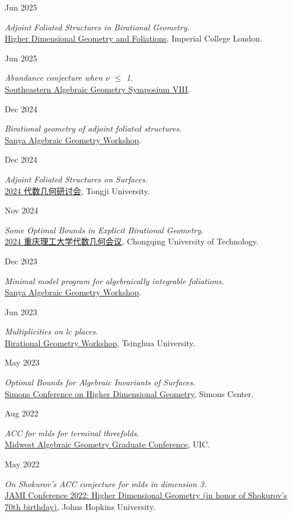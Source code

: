 \documentclass[11pt]{article}
\newlength{\datewidth}
\newcommand{\entry}[2]{%
  \noindent
  \begin{minipage}[t]{\datewidth}
    \raggedright\small\color{muted}#1
  \end{minipage}%
  \hfill%
  \begin{minipage}[t]{\dimexpr\linewidth-\datewidth-0.1in\relax}
    \raggedright #2
  \end{minipage}\par\vspace{4pt}
}
\begin{document}
\entry{Jun 2025}{\emph{Adjoint Foliated Structures in Birational Geometry.}\\ \href{https://simonsmoduli.com/events/london/}{Higher Dimensional Geometry and Foliations}, Imperial College London.}

\entry{Jun 2025}{\emph{Abundance conjecture when $\nu$ $\le$ 1.}\\ \href{https://math.sustech.edu.cn/conference/13283.html?lang=en}{Southeastern Algebraic Geometry Symposium VIII}.}

\entry{Dec 2024}{\emph{Birational geometry of adjoint foliated structures.}\\ \href{https://www.tsimf.cn/meeting/agenda?id=390}{Sanya Algebraic Geometry Workshop}.}

\entry{Dec 2024}{\emph{Adjoint Foliated Structures on Surfaces.}\\ \href{https://math.tongji.edu.cn/info/1019/11822.htm}{2024 {\cnfont 代数几何研讨会}}, Tongji University.}

\entry{Nov 2024}{\emph{Some Optimal Bounds in Explicit Birational Geometry.}\\ \href{https://msrc.cqut.edu.cn/info/1014/2602.htm}{2024 {\cnfont 重庆理工大学代数几何会议}}, Chongqing University of Technology.}

\entry{Dec 2023}{\emph{Minimal model program for algebraically integrable foliations.}\\ \href{https://www.tsimf.cn/meeting/report?id=360&rid=609}{Sanya Algebraic Geometry Workshop}.}

\entry{Jun 2023}{\emph{Multiplicities on lc places.}\\ \href{https://qzc.tsinghua.edu.cn/en/info/1122/2509.htm}{Birational Geometry Workshop}, Tsinghua University.}

\entry{May 2023}{\emph{Optimal Bounds for Algebraic Invariants of Surfaces.}\\ \href{https://sites.google.com/view/simonsconferences/simons-centre/higher-dimensional-geometry_1?authuser=0}{Simons Conference on Higher Dimensional Geometry}, Simons Center.}

\entry{Aug 2022}{\emph{ACC for mlds for terminal threefolds.}\\ \href{https://sites.google.com/uic.edu/maggc-2022/schedule?authuser=0}{Midwest Algebraic Geometry Graduate Conference}, UIC.}

\entry{May 2022}{\emph{On Shokurov's ACC conjecture for mlds in dimension 3.}\\ \href{https://sites.google.com/view/jami2022/schedule?authuser=0}{JAMI Conference 2022: Higher Dimensional Geometry (in honor of Shokurov's 70th birthday)}, Johns Hopkins University.}
\end{document}
